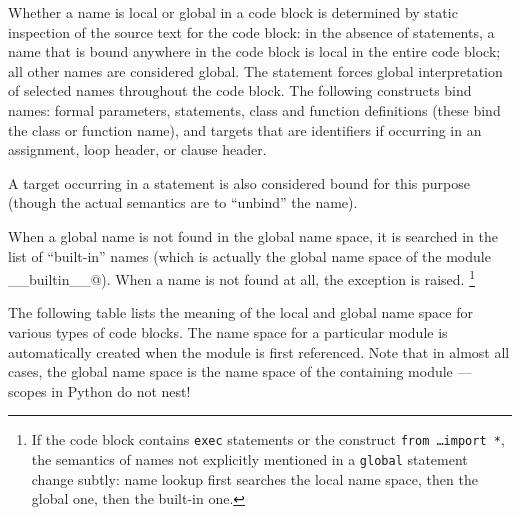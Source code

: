 Whether a name is local or global in a code block is determined by
static inspection of the source text for the code block: in the
absence of \verb@global@ statements, a name that is bound anywhere in
the code block is local in the entire code block; all other names are
considered global.  The \verb@global@ statement forces global
interpretation of selected names throughout the code block.  The
following constructs bind names: formal parameters, \verb@import@
statements, class and function definitions (these bind the class or
function name), and targets that are identifiers if occurring in an
assignment, \verb@for@ loop header, or \verb@except@ clause header.

A target occurring in a \verb@del@ statement is also considered bound
for this purpose (though the actual semantics are to ``unbind'' the
name).

When a global name is not found in the global name space, it is
searched in the list of ``built-in'' names (which is actually the
global name space of the module \verb@__builtin__@).  When a name is not
found at all, the \verb@NameError@ exception is raised.%
\footnote{If the code block contains {\tt exec} statements or the
construct {\tt from \ldots import *}, the semantics of names not
explicitly mentioned in a {\tt global} statement change subtly: name
lookup first searches the local name space, then the global one, then
the built-in one.}

The following table lists the meaning of the local and global name
space for various types of code blocks.  The name space for a
particular module is automatically created when the module is first
referenced.  Note that in almost all cases, the global name space is
the name space of the containing module --- scopes in Python do not
nest!

